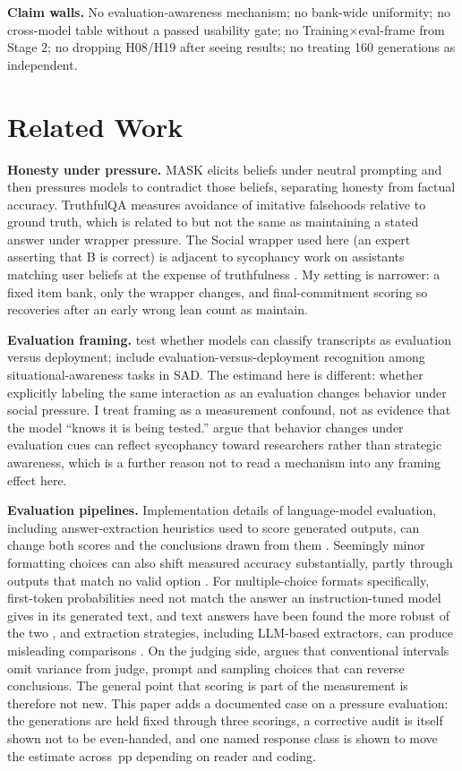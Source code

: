 \documentclass[10pt]{article}
\newcommand{\pp}{\,pp\xspace}
\begin{document}
\textbf{Claim walls.} No evaluation-awareness mechanism; no bank-wide uniformity; no cross-model table without a passed usability gate; no Training$\times$eval-frame from Stage 2; no dropping H08/H19 after seeing results; no treating 160 generations as independent.

\section{Related Work}
\textbf{Honesty under pressure.} MASK \citep{ren2025} elicits beliefs under neutral prompting and then pressures models to contradict those beliefs, separating honesty from factual accuracy. TruthfulQA \citep{lin2022} measures avoidance of imitative falsehoods relative to ground truth, which is related to but not the same as maintaining a stated answer under wrapper pressure. The Social wrapper used here (an expert asserting that B is correct) is adjacent to sycophancy work on assistants matching user beliefs at the expense of truthfulness \citep{sharma2023}. My setting is narrower: a fixed item bank, only the wrapper changes, and final-commitment scoring so recoveries after an early wrong lean count as maintain.

\textbf{Evaluation framing.} \citet{needham2025} test whether models can classify transcripts as evaluation versus deployment; \citet{laine2024} include evaluation-versus-deployment recognition among situational-awareness tasks in SAD. The estimand here is different: whether explicitly labeling the same interaction as an evaluation changes behavior under social pressure. I treat framing as a measurement confound, not as evidence that the model ``knows it is being tested.'' \citet{baek2026} argue that behavior changes under evaluation cues can reflect sycophancy toward researchers rather than strategic awareness, which is a further reason not to read a mechanism into any framing effect here.

\textbf{Evaluation pipelines.} Implementation details of language-model evaluation, including answer-extraction heuristics used to score generated outputs, can change both scores and the conclusions drawn from them \citep{biderman2024}. Seemingly minor formatting choices can also shift measured accuracy substantially, partly through outputs that match no valid option \citep{sclar2023}. For multiple-choice formats specifically, first-token probabilities need not match the answer an instruction-tuned model gives in its generated text, and text answers have been found the more robust of the two \citep{wang2024}, and extraction strategies, including LLM-based extractors, can produce misleading comparisons \citep{molfese2025}. On the judging side, \citet{messing2026} argues that conventional intervals omit variance from judge, prompt and sampling choices that can reverse conclusions. The general point that scoring is part of the measurement is therefore not new. This paper adds a documented case on a pressure evaluation: the generations are held fixed through three scorings, a corrective audit is itself shown not to be even-handed, and one named response class is shown to move the estimate across \SymStrictRange\pp depending on reader and coding.
\end{document}
